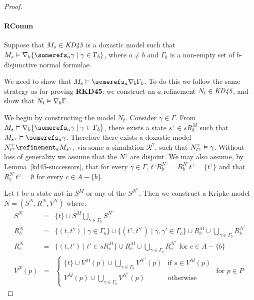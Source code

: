 \begin{proof}
\paragraph{RComm} 
Suppose that $M_s \in \textit{KD45}$ is a doxastic model such that $M_s \entails
\covers_b \{ \somerefs_a \gamma \mid \gamma \in \Gamma_b\}$, where $a \ne b$ and
$\Gamma_b$ is a non-empty set of $b$-disjunctive normal formulae. 

We need to show that $M_s \entails \somerefs_a \covers_b \Gamma_b$. To do this
we follow the same strategy as for proving {\bf RKD45}: we construct an
$a$-refinement $N_t \in \textit{KD45}$, and show that $N_t \vDash \nabla_b
\Gamma$.

We begin by constructing the model $N_t$. Consider $\gamma \in \Gamma$. From
$M_s \entails \covers_b \{ \somerefs_a \gamma \mid \gamma \in \Gamma_b\}$, there
exists a state $s^\gamma \in sR^M_b$ such that $M_{s^\gamma} \entails
\somerefs_a \gamma$. Therefore there exists a doxastic model
$N^\gamma_{t^\gamma} \refinement_a M_{s^\gamma}$, via some $a$-simulation
$\mathcal{R}^\gamma$, such that $N^\gamma_{t^\gamma} \vDash \gamma$.  Without
loss of generality we assume that the $N^\gamma$ are disjoint. We may also
assume, by Lemma~\ref{kd45-successors}, that for every $\gamma \in \Gamma$,
$t^\gamma R^{N^\gamma}_b = R^{N^\gamma}_b t^\gamma = \{t^\gamma\}$ and that
$R^{N^\gamma}_c t^\gamma = \emptyset$ for every $c \in A - \{b\}$.

Let $t$ be a state not in $S^M$ or any of the $S^{N^\gamma}$. Then we construct
a Kripke model $N = (S^N, R^N, V^N)$ where:
\begin{eqnarray*}
S^N &=& \{t\} \cup S^M \bigcup_{\gamma \in \Gamma_b} S^{N^\gamma}\\
R^N_b &=& \{(t, t^\gamma) \mid \gamma \in \Gamma_b\} \cup \{(t^\gamma,
t^{\gamma'}) \mid \gamma, \gamma' \in \Gamma_b\} \cup R^M_b \cup \bigcup_{\gamma
\in \Gamma_b} R^{N^\gamma}_b\\
R^N_c &=& \{(t, t') \mid t' \in sR^M_c\} \cup R^M_c \cup \bigcup_{\gamma \in
\Gamma_b} R^{N^\gamma}_c \text{ for $c \in A - \{b\}$}\\
V^N(p) &=& 
\begin{cases}
\displaystyle \{t\} \cup V^M(p) \cup \bigcup_{\gamma \in \Gamma_b}
V^{N^\gamma}(p) & \text{if $s \in V^M(p)$}\\
\displaystyle V^M(p) \cup \bigcup_{\gamma \in \Gamma_b} V^{N^\gamma}(p) &
\text{otherwise}
\end{cases}
\text{ for $p \in P$}
\end{eqnarray*}


\end{proof}
